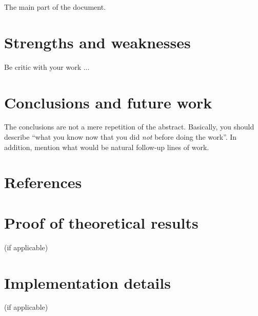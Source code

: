 \documentclass[anon]{CI}
\begin{document}
The main part of the document.

\section{Strengths and weaknesses}

Be critic with your work ...

\section{Conclusions and future work}

The conclusions are not a mere repetition of the abstract. Basically, you should describe ``what you know now that you did \emph{not} before doing the work''. In addition, mention what would be natural follow-up lines of work.

\section*{References}




\appendix

\section{Proof of theoretical results} (if applicable)

\section{Implementation details} (if applicable)
\end{document}

